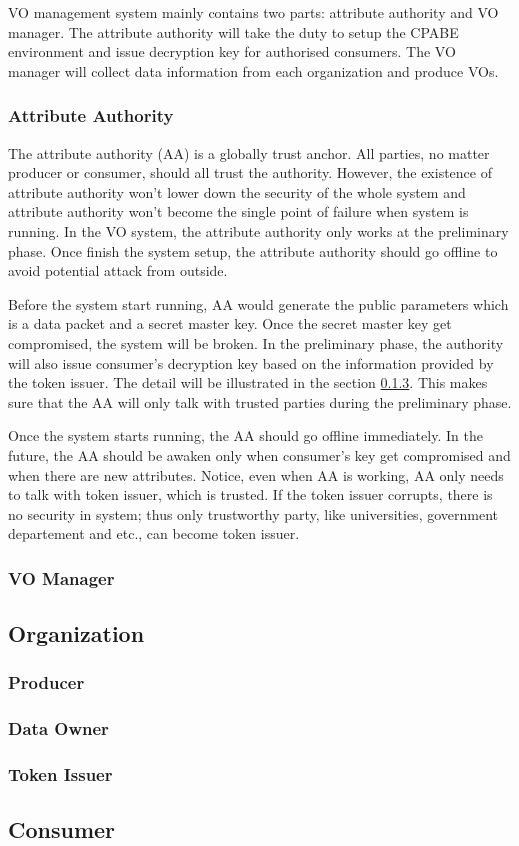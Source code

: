 VO management system mainly contains two parts: attribute authority and VO manager.
The attribute authority will take the duty to setup the CPABE environment and issue decryption key for authorised consumers.
The VO manager will collect data information from each organization and produce VOs.

\subsubsection{Attribute Authority}
The attribute authority (AA) is a globally trust anchor.
All parties, no matter producer or consumer, should all trust the authority.
However, the existence of attribute authority won't lower down the security of the whole system and attribute authority won't become the single point of failure when system is running.
In the VO system, the attribute authority only works at the preliminary phase.
Once finish the system setup, the attribute authority should go offline to avoid potential attack from outside.

Before the system start running, AA would generate the public parameters which is a data packet and a secret master key.
Once the secret master key get compromised, the system will be broken.
In the preliminary phase, the authority will also issue consumer's decryption key based on the information provided by the token issuer.
The detail will be illustrated in the section \ref{token-issuer}.
This makes sure that the AA will only talk with trusted parties during the preliminary phase.

Once the system starts running, the AA should go offline immediately.
In the future, the AA should be awaken only when consumer's key get compromised and when there are new attributes.
Notice, even when AA is working, AA only needs to talk with token issuer, which is trusted.
If the token issuer corrupts, there is no security in system; thus only trustworthy party, like universities, government departement and etc., can become token issuer.

\subsubsection{VO Manager}


\subsection{Organization}

\subsubsection{Producer}

\subsubsection{Data Owner}

\subsubsection{Token Issuer} \label{token-issuer}


\subsection{Consumer}